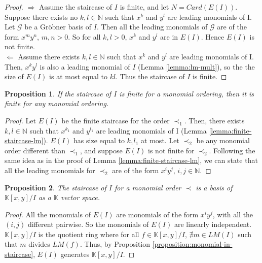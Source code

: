 \documentclass{article}
\newtheorem{proposition}{Proposition}[section]
\begin{document}
\begin{proof} %
    $\Rightarrow$ Assume the staircase of $I$ is finite, and let $N = Card(E(I))$. Suppose there exists no $k, l \in \mathbb{N}$ such that $x^{k}$ and $y^{l}$ are leading monomials of I. Let $\mathscr{G}$ be a Gröbner basis of $I$. Then all the leading monomials of $\mathscr{G}$ are of the form $x^{m}y^{n}$, $m,n > 0$. So for all $k, l > 0$, $x^{k}$ and $y^{l}$ are in $E(I)$. Hence $E(I)$ is not finite. \\ %
    $\Leftarrow$ Assume there exists $k, l \in \mathbb{N}$ such that $x^{k}$ and $y^{l}$ are leading monomials of I. Then, $x^{k}y^{l}$ is also a leading monomial of $I$ (Lemma \ref{lemma:lm-mult}), so the the size of $E(I)$ is at most equal to $kl$. Thus the staircase of $I$ is finite.
\end{proof}

\begin{proposition} \label{proposition:staircase-finite-any-order}
    If the staircase of $I$ is finite for a monomial ordering, then it is finite for any monomial ordering.
\end{proposition}

\begin{proof} %
    Let $E(I)$ be the finite staircase for the order $\prec_{1}$. Then, there exists $k, l \in \mathbb{N}$ such that $x^{k_{1}}$ and $y^{l_{1}}$ are leading monomials of I (Lemma \ref{lemma:finite-staircase-lm}). $E(I)$ has size equal to $k_{1}l_{1}$ at most. Let $\prec_{2}$ be any monomial order different than $\prec_{1}$, and suppose $E(I)$ is not finite for $\prec_{2}$. Following the same idea as in the proof of Lemma \ref{lemma:finite-staircase-lm}, we can state that all the leading monomials for $\prec_{2}$ are of the form $x^{i}y^{j}$, $i, j \in \mathbb{N}$. 
\end{proof}

\begin{proposition}
    The staircase of $I$ for a monomial order $\prec$ is a basis of $\mathbb{K}[x, y] / I$ as a $\mathbb{K}$ vector space.
\end{proposition}

\begin{proof}
    All the monomials of $E(I)$ are monomials of the form $x^{i}y^{j}$, with all the $(i, j)$ different pairwise. So the monomials of $E(I)$ are linearly independent. $\mathbb{K}[x,y] / I$ is the quotient ring where for all $f \in \mathbb{K}[x,y] / I$, $\nexists m \in LM(I)$ such that $m$ divides $LM(f)$. Thus, by Proposition \ref{proposition:monomial-in-staircase}, $E(I)$ generates $\mathbb{K}[x,y] / I$.
\end{proof}
\end{document}
